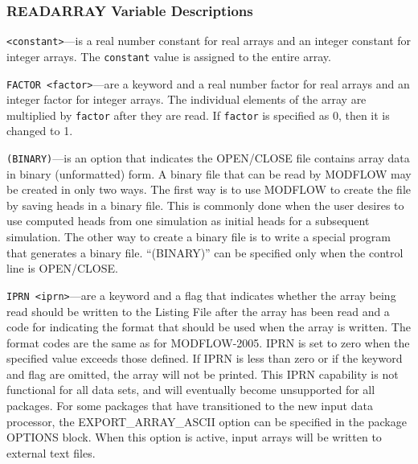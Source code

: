 \subsubsection{READARRAY Variable Descriptions}

\begin{description}

\item \texttt{<constant>}---is a real number constant for real arrays and an integer constant for integer arrays. The \texttt{constant} value is assigned to the entire array. 

\item \texttt{FACTOR <factor>}---are a keyword and a real number factor for real arrays and an integer factor for integer arrays. The individual elements of the array are multiplied by \texttt{factor} after they are read. If \texttt{factor} is specified as 0, then it is changed to 1.

\item \texttt{(BINARY)}---is an option that indicates the OPEN/CLOSE file contains array data in binary (unformatted) form. A binary file that can be read by MODFLOW may be created in only two ways. The first way is to use MODFLOW to create the file by saving heads in a binary file. This is commonly done when the user desires to use computed heads from one simulation as initial heads for a subsequent simulation. The other way to create a binary file is to write a special program that generates a binary file.  ``(BINARY)'' can be specified only when the control line is OPEN/CLOSE.

\item \texttt{IPRN <iprn>}---are a keyword and a flag that indicates whether the array being read should be written to the Listing File after the array has been read and a code for indicating the format that should be used when the array is written. The format codes are the same as for MODFLOW-2005. IPRN is set to zero when the specified value exceeds those defined. If IPRN is less than zero or if the keyword and flag are omitted, the array will not be printed.  This IPRN capability is not functional for all data sets, and will eventually become unsupported for all packages.  For some packages that have transitioned to the new input data processor, the EXPORT\_ARRAY\_ASCII option can be specified in the package OPTIONS block.  When this option is active, input arrays will be written to external text files.

\end{description}

